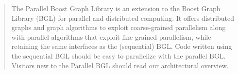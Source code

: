 	\begin{quotation}
		The Parallel Boost Graph Library is an extension to the Boost Graph Library (BGL) for parallel and distributed computing. It offers distributed graphs and graph algorithms to exploit coarse-grained parallelism along with parallel algorithms that exploit fine-grained parallelism, while retaining the same interfaces as the (sequential) BGL. Code written using the sequential BGL should be easy to parallelize with the parallel BGL. Visitors new to the Parallel BGL should read our architectural overview.\cite{wwwBoost} 
		\end{quotation} 

